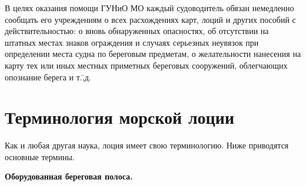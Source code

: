 \documentclass[a4paper, 12pt, twoside, final, book, russian, fittopage, cyremdash]{ncc}
\begin{document}
В целях оказания помощи ГУНиО МО каждый судоводитель обязан немедленно сообщать его учреждениям о всех расхождениях карт, лоций и других пособий с действительностью: о вновь обнаруженных опасностях, об отсутствии на штатных местах знаков ограждения и случаях серьезных неувязок при определении места судна по береговым предметам, о желательности нанесения на карту тех или иных местных приметных береговых сооружений, облегчающих опознание берега и т.\=,д. 

\section{Терминология морской лоции}

Как и любая другая наука, лоция имеет свою терминологию. Ниже приводятся основные термины.

\textbf{Оборудованная береговая полоса.}
\end{document}
